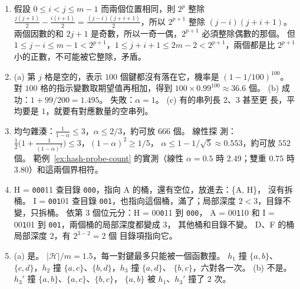\begin{enumerate}[itemsep=0.15em]
\item 假設 $0 \le i < j \le m - 1$ 而兩個位置相同，則 $2^p$ 整除
$\frac{j(j+1)}{2} - \frac{i(i+1)}{2} = \frac{(j - i)(j + i + 1)}{2}$，所以 $2^{p+1}$
整除 $(j - i)(j + i + 1)$。 兩個因數的和 $2j + 1$ 是奇數，所以一奇一偶，$2^{p+1}$
必須整除偶數的那個。 但
$1 \le j - i \le m - 1 < 2^{p+1}$，$1 \le j + i + 1 \le 2m - 2 < 2^{p+1}$，兩個都是比
$2^{p+1}$ 小的正數，不可能被它整除，矛盾。

\item (a) 第 $j$ 格是空的，表示 $100$ 個鍵都沒有落在它，機率是 $(1 - 1/100)^{100}$。
對 $100$ 格的指示變數取期望值再相加，得到 $100 \times 0.99^{100} \approx 36.6$ 個。
(b) 成功：$1 + 99/200 = 1.495$。 失敗：$\alpha = 1$。 (c) 有的串列長 $2$、$3$ 甚至更
長，平均要是 $1$，就要有對應數量的空串列。

\item 均勻雜湊：$\frac{1}{1-\alpha} \le 3$，$\alpha \le 2/3$，約可放 $666$ 個。 線性探
測：$\frac12\bigl(1 + \frac{1}{(1-\alpha)^2}\bigr) \le 3$，$(1-\alpha)^2 \ge 1/5$，
$\alpha \le 1 - 1/\sqrt5 \approx 0.553$，約可放 $552$ 個。 範例~\ref{ex:hash-probe-count}
的實測（線性 $\alpha = 0.5$ 時 $2.49$；雙重 $0.75$ 時 $3.80$）和這兩個界相符。

\item H = \texttt{000}11 查目錄 \texttt{000}，指向 A 的桶，還有空位，放進去：\{A, H\}，
沒有拆桶。 I = \texttt{001}01 查目錄 \texttt{001}，也指向這個桶，滿了；局部深度
$2 < 3$，目錄不變，只拆桶。 依第 $3$ 個位元分：H = 00\texttt{0}11 到 \texttt{000}，
A = 00\texttt{1}10 和 I = 00\texttt{1}01 到 \texttt{001}，兩個桶的局部深度都變成 $3$，
其他桶和目錄不變。 D、F 的桶局部深度 $2$，有 $2^{3-2} = 2$ 個
目錄項指向它。

\item (a) 是。 $|\mathcal{H}|/m = 1.5$，每一對鍵最多只能被一個函數撞。 $h_1$ 撞
$\{a, b\}$、$\{c, d\}$，$h_2$ 撞 $\{a, c\}$、$\{b, d\}$，$h_3$ 撞 $\{a, d\}$、
$\{b, c\}$，六對各一次。 (b) 不是。 $h_3'$ 撞 $\{a, b\}$、$\{a, c\}$、$\{b, c\}$，
$\{a, b\}$ 被 $h_1$、$h_3'$ 撞了 $2$ 次。


\end{enumerate}
